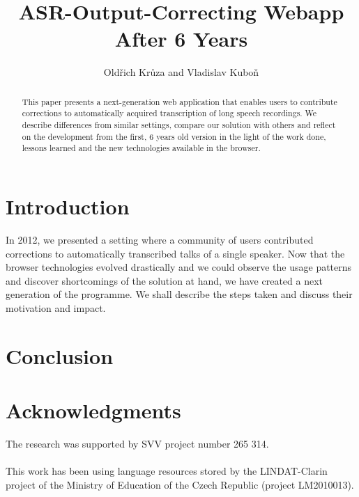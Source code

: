 \documentclass{llncs}
\begin{document}
\newtheorem{Definition}{Definition}
\title{ASR-Output-Correcting Webapp After 6 Years}

\author{Oldřich Krůza and Vladislav Kuboň}

\maketitle

\begin{abstract}

This paper presents a next-generation web application that enables users to
contribute corrections to automatically acquired transcription of long speech
recordings. We describe differences from similar settings, compare our solution
with others and reflect on the development from the first, 6 years old version
in the light of the work done, lessons learned and the new technologies
available in the browser.

\end{abstract}

\section{Introduction}

In 2012\cite{kruuza2012making}, we presented a setting where a community of
users contributed corrections to automatically transcribed talks of a single
speaker. Now that the browser technologies evolved drastically and we could
observe the usage patterns and discover shortcomings of the solution at hand, we
have created a next generation of the programme. We shall describe the steps
taken and discuss their motivation and impact.

\section{}

\section{Conclusion}

\section*{Acknowledgments}

The research was supported by SVV project number 265 314.\\
\\
This work has been using language resources stored
by the LINDAT-Clarin project of the Ministry of
Education of the Czech Republic (project LM2010013).
%


\end{document}
